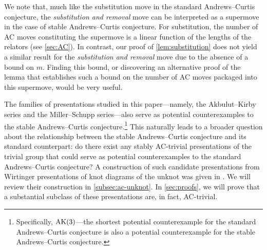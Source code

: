 We note that, much like the substitution move in the standard Andrews--Curtis conjecture, the \emph{substitution and removal} move can be interpreted as a supermove in the case of stable Andrews--Curtis conjecture. For substitution, the number of AC moves constituting the supermove is a linear function of the lengths of the relators (see \cref{sec:AC}). In contrast, our proof of \cref{lem:substitution} does not yield a similar result for the \emph{substitution and removal} move due to the absence of a bound on $m$. Finding this bound, or discovering an alternative proof of the lemma that establishes such a bound on the number of AC moves packaged into this supermove, would be very useful.

The families of presentations studied in this paper---namely, the Akbulut--Kirby series and the Miller--Schupp series---also serve as potential counterexamples to the stable Andrews--Curtis conjecture.\footnote{Specifically, $\text{AK}(3)$---the shortest potential counterexample for the standard Andrews--Curtis conjecture is also a potential counterexample for the stable Andrews--Curtis conjecture.}
This naturally leads to a broader question about the relationship between the stable Andrews--Curtis conjecture and its standard counterpart: do there exist any stably AC-trivial presentations of the trivial group that could serve as potential counterexamples to the standard Andrews--Curtis conjecture? 
A construction of such candidate presentations from Wirtinger presentations of knot diagrams of the unknot was given in \cite{MMS}. We will review their construction in \cref{subsec:ac-unknot}. In \cref{sec:proofs}, we will prove that a substantial subclass of these presentations are, in fact, AC-trivial. 



